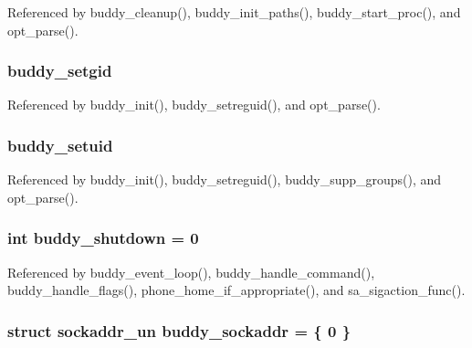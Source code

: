 Referenced by buddy\_\-cleanup(), buddy\_\-init\_\-paths(), buddy\_\-start\_\-proc(), and opt\_\-parse().

\subsubsection[{buddy\_\-setgid}]{ {\bf buddy\_\-setgid}}\label{buddy_8c_a94f0c0963c51ae59585d090bd146267c}


Referenced by buddy\_\-init(), buddy\_\-setreguid(), and opt\_\-parse().

\subsubsection[{buddy\_\-setuid}]{ {\bf buddy\_\-setuid}}\label{buddy_8c_a2ef8d11cc4ac2862fbe8ce2112e2e4fb}


Referenced by buddy\_\-init(), buddy\_\-setreguid(), buddy\_\-supp\_\-groups(), and opt\_\-parse().

\subsubsection[{buddy\_\-shutdown}]{\setlength{\rightskip}{0pt plus 5cm}int {\bf buddy\_\-shutdown} = 0\hspace{0.3cm}{\ttfamily  [static]}}\label{buddy_8c_a9617826c673a1b5913121735ec530410}


Referenced by buddy\_\-event\_\-loop(), buddy\_\-handle\_\-command(), buddy\_\-handle\_\-flags(), phone\_\-home\_\-if\_\-appropriate(), and sa\_\-sigaction\_\-func().

\subsubsection[{buddy\_\-sockaddr}]{\setlength{\rightskip}{0pt plus 5cm}struct {\bf sockaddr\_\-un} {\bf buddy\_\-sockaddr} = \{ 0 \}\hspace{0.3cm}{\ttfamily  [static]}}\label{buddy_8c_ac6fd0c340d369754b0ba41080c21377d}


